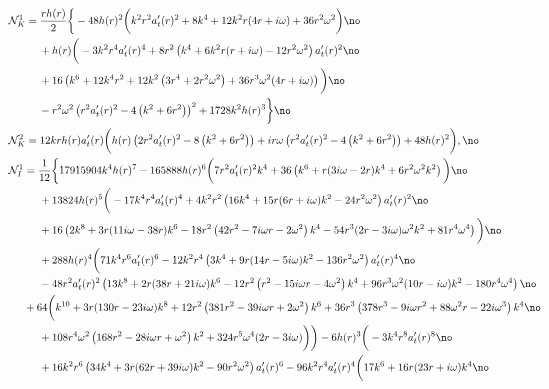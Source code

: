 \documentclass[preprintnumbers,aps,prd,longbibliography,nofootinbib,nobibnotes,amsmath,amssymb]{revtex4}
\begin{document}
\begin{align}
	&\hspace{-1cm}\mathcal{N}_K^1 = \frac{r h(r)}{2} \bigg\{-48 h(r)^2 \bigg(k^2 r^2 a_t'(r)^2+8 k^4+12 k^2 r (4 r+i \omega )+36 r^2 \omega ^2\bigg)\no\\
	&+h(r) \bigg(-3 k^2 r^4 a_t'(r)^4+8 r^2 \left(k^4+6 k^2 r (r+i \omega )-12 r^2 \omega ^2\right) a_t'(r)^2\no\\
	&+16 \left(k^6+12 k^4 r^2+12 k^2 \left(3 r^4+2 r^2 \omega ^2\right)+36 r^3 \omega ^2 (4 r+i \omega )\right)\bigg)\no\\
	&-r^2 \omega ^2 \left(r^2 a_t'(r)^2-4 \left(k^2+6 r^2\right)\right)^2+1728 k^2 h(r)^3\bigg\}\no\\
	&\hspace{-1cm}\mathcal{N}_K^2 = 12 k r h(r) a_t'(r) \bigg(h(r) \left(2 r^2 a_t'(r){}^2-8 \left(k^2+6 r^2\right)\right)+i r \omega  \left(r^2 a_t'(r){}^2-4 \left(k^2+6 r^2\right)\right)+48 h(r)^2\bigg),\no\\
		&\hspace{-1cm}\mathcal{N}_I^1 = \frac{1}{12} \bigg\{17915904 k^4 h(r)^7-165888 h(r)^6 \bigg(7 r^2 a_t'(r)^2 k^4+36 \left(k^6+r (3 i \omega -2 r) k^4+6 r^2 \omega ^2 k^2\right)\bigg) \no\\
		&+13824 h(r)^5 \bigg(-17 k^4 r^4 a_t'(r)^4+4 k^2 r^2 \left(16 k^4+15 r (6 r+i \omega ) k^2-24 r^2 \omega ^2\right) a_t'(r)^2\no\\
		&+16 \left(2 k^8+3 r (11 i \omega -38 r) k^6-18 r^2 \left(42 r^2-7 i \omega  r-2 \omega ^2\right) k^4-54 r^3 (2 r-3 i \omega ) \omega ^2 k^2+81 r^4 \omega ^4\right)\bigg) \no\\
		&+288 h(r)^4 \bigg(71 k^4 r^6 a_t'(r)^6-12 k^2 r^4 \left(3 k^4+9 r (14 r-5 i \omega ) k^2-136 r^2 \omega ^2\right) a_t'(r)^4\no\\
		&-48 r^2 a_t'(r)^2 \left(13 k^8+2 r (38 r+21 i \omega ) k^6-12 r^2 \left(r^2-15 i \omega  r-4 \omega ^2\right) k^4+96 r^3 \omega ^2 (10 r-i \omega ) k^2-180 r^4 \omega ^4\right) \no\\
		&\hspace{-0.5cm}+64 \bigg(k^{10}+3 r (130 r-23 i \omega ) k^8+12 r^2 \left(381 r^2-39 i \omega  r+2 \omega ^2\right) k^6+36 r^3 \left(378 r^3-9 i \omega  r^2+88 \omega ^2 r-22 i \omega ^3\right) k^4\no\\
		&+108 r^4 \omega ^2 \left(168 r^2-28 i \omega  r+\omega ^2\right) k^2+324 r^5 \omega ^4 (2 r-3 i \omega )\bigg)\bigg) -6 h(r)^3 \bigg(-3 k^4 r^8 a_t'(r)^8\no\\
		&+16 k^2 r^6 \left(34 k^4+3 r (62 r+39 i \omega ) k^2-90 r^2 \omega ^2\right) a_t'(r)^6-96 k^2 r^4 a_t'(r)^4 \bigg(17 k^6+16 r (23 r+i \omega ) k^4\no\\

\end{align}
\end{document}
